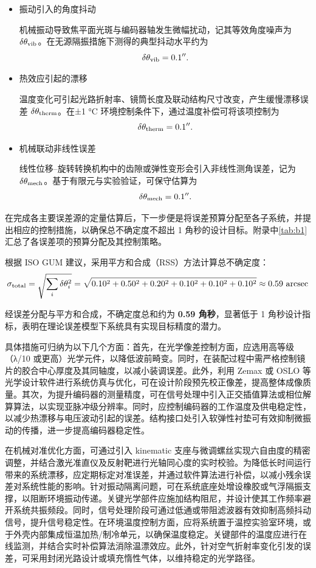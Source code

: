 \begin{itemize}
	\item 振动引入的角度抖动
	
	机械振动导致焦平面光斑与编码器轴发生微幅扰动，记其等效角度噪声为 $\delta\theta_{\rm vib}$。在无源隔振措施下测得的典型抖动水平约为
	$$
	\delta\theta_{\rm vib}=0.1''.
	$$
	
	\item 热效应引起的漂移
	
	温度变化可引起光路折射率、镜筒长度及联动结构尺寸改变，产生缓慢漂移误差 $\delta\theta_{\rm therm}$。在±1 °C 环境控制条件下，通过温度补偿可将该项控制为
	$$
	\delta\theta_{\rm therm}=0.1''.
	$$
	
	\item 机械联动非线性误差
	
	线性位移–旋转转换机构中的齿隙或弹性变形会引入非线性测角误差，记为 $\delta\theta_{\rm mech}$。基于有限元与实验验证，可保守估算为
	$$
	\delta\theta_{\rm mech}=0.1''.
	$$
\end{itemize}

在完成各主要误差源的定量估算后，下一步便是将误差预算分配至各子系统，并提出相应的控制措施，以确保总不确定度不超出 1 角秒的设计目标。附录中\cref{tab:b1}汇总了各误差项的预算分配及其控制策略。

根据 ISO GUM 建议，采用平方和合成（RSS）方法计算总不确定度：
$$
\sigma_{\rm total} = \sqrt{\sum_i \delta\theta_i^2}
= \sqrt{0.10^2 + 0.50^2 + 0.20^2 + 0.10^2 + 0.10^2 + 0.10^2}
\approx 0.59~\text{arcsec}
$$

\begin{uclaim}
	经误差分配与平方和合成，不确定度总和约为 \textbf{0.59 角秒}，显著低于 1 角秒设计指标，表明在理论误差模型下系统具有实现目标精度的潜力。
\end{uclaim}

具体措施可归纳为以下几个方面：首先，在光学像差控制方面，应选用高等级（λ/10 或更高）光学元件，以降低波前畸变。同时，在装配过程中需严格控制镜片的胶合中心厚度及其同轴度，以减小装调误差。此外，利用 Zemax 或 OSLO 等光学设计软件进行系统仿真与优化，可在设计阶段预先校正像差，提高整体成像质量。其次，为提升编码器的测量精度，可在信号处理中引入正交插值算法或相位解算算法，以实现亚脉冲级分辨率。同时，应控制编码器的工作温度及供电稳定性，以减少热漂移与电压波动引起的误差。结构接口处引入软弹性衬垫可有效抑制微振动的传播，进一步提高编码器稳定性。

在机械对准优化方面，可通过引入 kinematic 支座与微调螺丝实现六自由度的精密调整，并结合激光准直仪及反射靶进行光轴同心度的实时校验。为降低长时间运行带来的系统漂移，应定期标定对准误差，并通过软件算法进行补偿，以减小残余误差对系统性能的影响。针对振动隔离问题，可在系统底座处增设橡胶或气浮隔振支撑，以阻断环境振动传递。关键光学部件应施加结构阻尼，并设计使其工作频率避开系统共振频段。同时，信号处理阶段可通过低通或带阻滤波器有效抑制高频抖动信号，提升信号稳定性。在环境温度控制方面，应将系统置于温控实验室环境，或于外壳内部集成恒温加热/制冷单元，以确保温度稳定。关键部件的温度应进行在线监测，并结合实时补偿算法消除温漂效应。此外，针对空气折射率变化引发的误差，可采用封闭光路设计或填充惰性气体，以维持稳定的光学路径。

